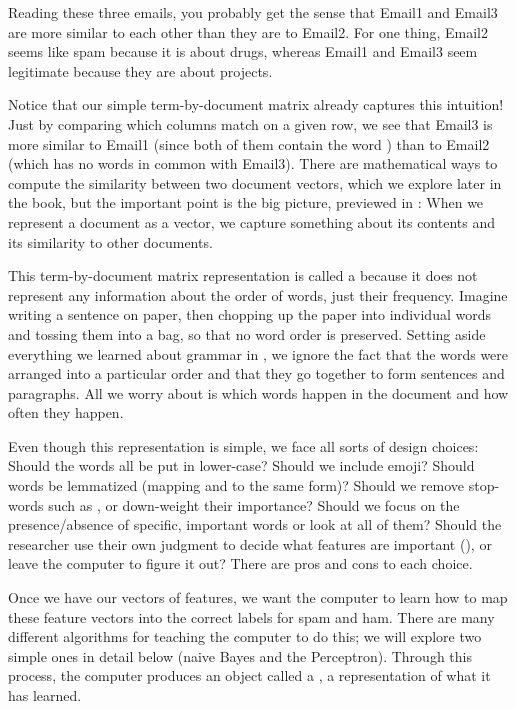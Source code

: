  Reading these three emails, you probably get the sense that Email1 and Email3 are more similar to each other than they are to Email2.  For one thing, Email2 seems like spam because it is about drugs, whereas Email1 and Email3 seem legitimate because they are about projects.

Notice that our simple term-by-document matrix already captures this intuition!  Just by comparing which columns match on a given row, we see that Email3 is more similar to Email1 (since both of them contain the word ) than to Email2 (which has no words in common with Email3).  There are mathematical ways to compute the similarity between two document vectors, which we explore later in the book, but the important point is the big picture, previewed in : When we represent a document as a vector, we capture something about its contents and its similarity to other documents.

This term-by-document matrix representation is called a  because it does not represent any information about the order of words, just their frequency.  Imagine writing a sentence on paper, then chopping up the paper into individual words and tossing them into a bag, so that no word order is preserved. Setting aside everything we learned about grammar in , we ignore the fact that the words were arranged into a particular order and that they go together to form sentences and paragraphs.  All we worry about is which words happen in the document and how often they happen.

Even though this representation is simple, we face all sorts of design choices: Should the words all be put in lower-case?  Should we include emoji?  Should words be lemmatized (mapping  and  to the same form)? Should we remove stop-words such as , or down-weight their importance? Should we focus on the presence/absence of specific, important words or look at all of them?  Should the researcher use their own judgment to decide what features are important (), or leave the computer to figure it out?  There are pros and cons to each choice.

Once we have our vectors of features, we want the computer to learn how to map these feature vectors into the correct labels for spam and ham.  There are many different algorithms for teaching the computer to do this; we will explore two simple ones in detail below (naive Bayes and the Perceptron).  Through this process, the computer produces an object called a , a representation of what it has learned.

